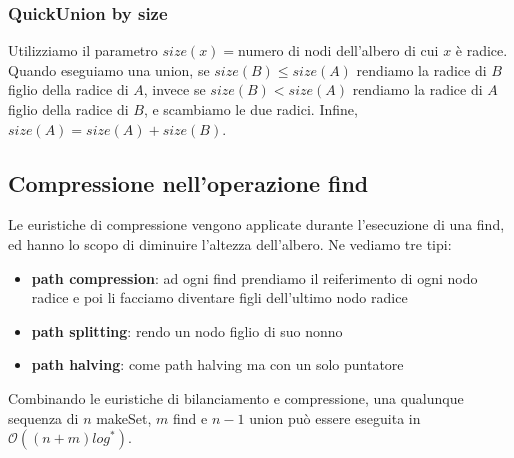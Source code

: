 \documentclass[11pt]{article}
\begin{document}
\subsubsection{QuickUnion by size}
Utilizziamo il parametro $size(x)=$numero di nodi dell'albero di cui $x$ è radice.
Quando eseguiamo una union, se $size(B)\leq size(A)$ rendiamo la radice di $B$ figlio della radice di $A$, invece se 
$size(B)<size(A)$ rendiamo la radice di $A$ figlio della radice di $B$, e scambiamo le due radici. Infine, $size(A)=size(A)+size(B)$.
\subsection{Compressione nell'operazione find}
Le euristiche di compressione vengono applicate durante l'esecuzione di una find, ed hanno lo scopo di diminuire l'altezza
dell'albero. Ne vediamo tre tipi:
\begin{itemize}
    \item \textbf{path compression}: ad ogni find prendiamo il reiferimento di ogni nodo radice e poi li facciamo diventare 
    figli dell'ultimo nodo radice
    \item \textbf{path splitting}: rendo un nodo figlio di suo nonno
    \item \textbf{path halving}: come path halving ma con un solo puntatore
\end{itemize}
Combinando le euristiche di bilanciamento e compressione, una qualunque sequenza di $n$ makeSet, $m$ find e $n-1$ union 
può essere eseguita in $\mathcal{O}((n+m)log^*)$.
\section{}
\end{document}
